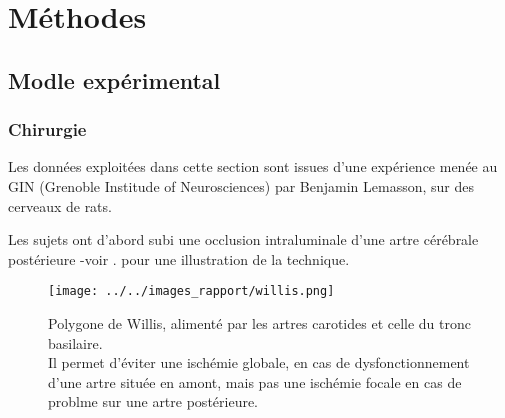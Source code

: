 \section{M\'ethodes}

\makeatletter
\renewcommand{\thefigure}{\ifnum \c@section>\z@ \thesection.\fi
 \@arabic\c@figure}
\makeatother
\begin{comment}
Remarque : pour renuméroter les sous-figures de la même manière
           (avec le package 'subfigure'), il suffit de rajouter
	   la ligne \let\p@subfigure\thefigure dans le préambule.
\end{comment}

\subsection{Modle exp\'erimental}

\subsubsection{Chirurgie}

Les donn\'ees exploit\'ees dans cette section sont issues d'une exp\'erience men\'ee au GIN (Grenoble Institude of Neurosciences) par Benjamin Lemasson, %
sur des cerveaux de rats.

\par
Les sujets ont d'abord subi une occlusion intraluminale d'une artre c\'er\'ebrale post\'erieure -voir \cite{Durukan_PBB_07}. pour une illustration de la technique.


\begin{figure}[H]
\texttt{[image: ../../images\_rapport/willis.png]}
\caption{Polygone de Willis, aliment\'e par les artres carotides et celle du tronc basilaire.
\\
Il permet d'\'eviter une isch\'emie globale, en cas de dysfonctionnement d'une artre situ\'ee en amont, %
mais pas une isch\'emie focale en cas de problme sur une artre post\'erieure.
}
\label{willis}
\end{figure}

